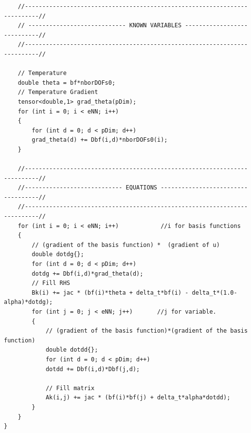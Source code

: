 \documentclass[]{article}
\begin{document}
\begin{lstlisting}
	//--------------------------------------------------------------------------//
	// ---------------------------- KNOWN VARIABLES ----------------------------//
	//--------------------------------------------------------------------------//
		
	// Temperature
	double theta = bf*nborDOFs0;
	// Temperature Gradient
	tensor<double,1> grad_theta(pDim);
	for (int i = 0; i < eNN; i++)
	{
		for (int d = 0; d < pDim; d++)
		grad_theta(d) += Dbf(i,d)*nborDOFs0(i); 
	}
		
	//--------------------------------------------------------------------------//
	//---------------------------- EQUATIONS -----------------------------------//
	//--------------------------------------------------------------------------// 
	for (int i = 0; i < eNN; i++)            //i for basis functions
	{
		// (gradient of the basis function) *  (gradient of u)
		double dotdg{};
		for (int d = 0; d < pDim; d++)
		dotdg += Dbf(i,d)*grad_theta(d);
		// Fill RHS
		Bk(i) += jac * (bf(i)*theta + delta_t*bf(i) - delta_t*(1.0-alpha)*dotdg);
		for (int j = 0; j < eNN; j++)       //j for variable.
		{
			// (gradient of the basis function)*(gradient of the basis function)
			double dotdd{};
			for (int d = 0; d < pDim; d++)
			dotdd += Dbf(i,d)*Dbf(j,d);
				
			// Fill matrix
			Ak(i,j) += jac * (bf(i)*bf(j) + delta_t*alpha*dotdd);
		}
	}
}	
\end{lstlisting}
\end{document}
